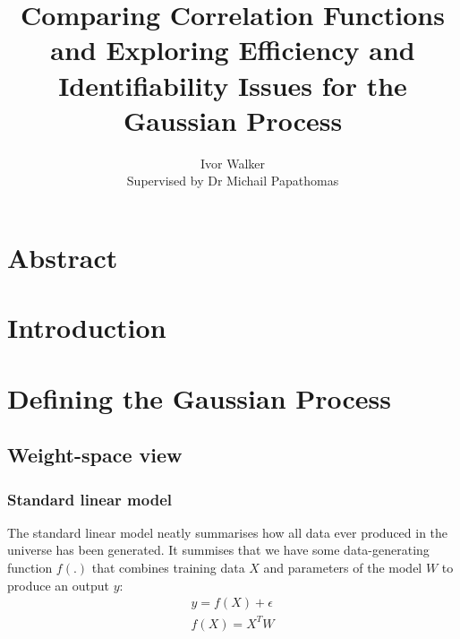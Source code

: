 \documentclass[10pt]{article}
\begin{document}
\title{Comparing Correlation Functions and Exploring Efficiency and Identifiability Issues for the Gaussian Process}
\author{
    Ivor Walker \\
    Supervised by Dr Michail Papathomas \\
}
\date{ }
\maketitle



\section*{Abstract}


\newpage
\tableofcontents
\newpage



\section{Introduction}



\section{Defining the Gaussian Process}



\subsection{Weight-space view \cite{gp-ml}}

\subsubsection{Standard linear model}
The standard linear model neatly summarises how all data ever produced in the universe has been generated. It summises that we have some data-generating function $f(.)$ that combines training data $X$ and parameters of the model $W$ to produce an output $y$:
\begin{equation} \label{eq:linear_model}
    \begin{aligned}
        y = f(X) + \epsilon \\
        f(X) = X^T W \\
    \end{aligned}
\end{equation}
\end{document}

